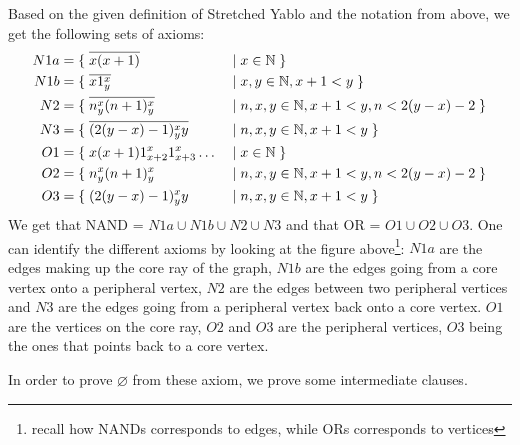 Based on the given definition of Stretched Yablo and the notation from above, we get the following sets of axioms:
\begin{align}
  N1a &= \{\; \overline{x(x+1)} \;&&|\; x \in \mathbb{N} \; \} \\
	N1b &= \{\; \overline{x1^x_y} \;&&|\; x,y \in \mathbb{N}, x+1 < y \; \} \\
	N2 &= \{\; \overline{n^x_y(n+1)^x_y} \;&&|\; n,x,y \in \mathbb{N}, x+1 < y, n < 2(y-x) - 2 \; \} \\
	N3 &= \{\; \overline{(2(y-x)-1)^x_yy} \;&&|\; n,x,y \in \mathbb{N}, x+1 < y \; \} \\
	O1 &= \{\; x(x+1)1^x_{x+2}1^x_{x+3}\dots \;&&|\; x \in \mathbb{N} \; \} \\
  O2 &= \{\; n^x_y(n+1)^x_y \;&&|\; n,x,y \in \mathbb{N}, x+1 < y, n < 2(y-x) - 2 \; \} \\
	O3 &= \{\; (2(y-x)-1)^x_yy \;&&|\; n,x,y \in \mathbb{N}, x+1 < y \; \}
\end{align}
We get that NAND = $N1a \cup N1b \cup N2 \cup N3$ and that OR = $O1 \cup O2 \cup O3$.
One can identify the different axioms by looking at the figure above\footnote{recall how NANDs corresponds to edges, while ORs corresponds to vertices}:
$N1a$ are the edges making up the core ray of the graph, $N1b$ are the edges going from a core vertex onto a peripheral vertex, $N2$ are the edges between two peripheral vertices and $N3$ are the edges going from a peripheral vertex back onto a core vertex.
$O1$ are the vertices on the core ray, $O2$ and $O3$ are the peripheral vertices, $O3$ being the ones that points back to a core vertex.

In order to prove $\varnothing$ from these axiom, we prove some intermediate clauses.
